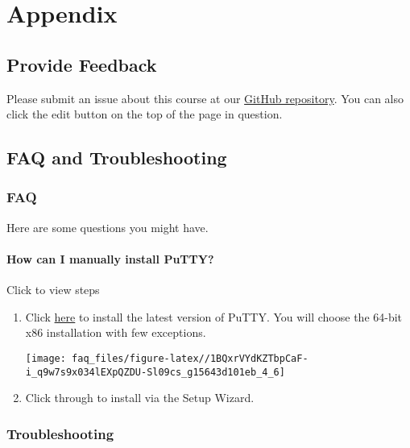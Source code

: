 \documentclass[
]{book}
\begin{document}
\hypertarget{part-appendix}{%
\part*{Appendix}\label{part-appendix}}

\hypertarget{feedback}{%
\chapter{Provide Feedback}\label{feedback}}

Please submit an issue about this course at our \href{https://github.com/fhdsl/FH_Cluster_Guide/issues/new}{GitHub repository}. You can also click the edit button on the top of the page in question.

\hypertarget{faq-and-troubleshooting}{%
\chapter{FAQ and Troubleshooting}\label{faq-and-troubleshooting}}

\hypertarget{faq}{%
\section{FAQ}\label{faq}}

Here are some questions you might have.

\hypertarget{manual-putty}{%
\subsection{How can I manually install PuTTY?}\label{manual-putty}}

Click to view steps

\begin{enumerate}
\def\labelenumi{\arabic{enumi}.}
\item
  Click \href{https://www.chiark.greenend.org.uk/~sgtatham/putty/latest.html}{here} to install the latest version of PuTTY. You will choose the 64-bit x86 installation with few exceptions.

  \texttt{[image: faq\_files/figure-latex//1BQxrVYdKZTbpCaF-i\_q9w7s9x034lEXpQZDU-Sl09cs\_g15643d101eb\_4\_6]}
\item
  Click through to install via the Setup Wizard.
\end{enumerate}

\hypertarget{troubleshooting}{%
\section{Troubleshooting}\label{troubleshooting}}
\end{document}
